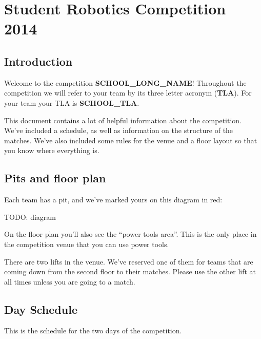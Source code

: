 \documentclass[12pt]{article}
\begin{document}
\section{Student Robotics Competition 2014}

\subsection{Introduction}

Welcome to the competition \textbf{SCHOOL_LONG_NAME}! Throughout the
competition we will refer to your team by its three letter acronym
(\textbf{TLA}). For your team your TLA is \textbf{SCHOOL_TLA}.

This document contains a lot of helpful information about the competition.
We've included a schedule, as well as information on the structure of the
matches. We've also included some rules for the venue and a floor layout so
that you know where everything is.

\subsection{Pits and floor plan}

Each team has a pit, and we've marked yours on this diagram in red:

TODO: diagram

On the floor plan you'll also see the ``power tools area''. This is the only
place in the competition venue that you can use power tools.

There are two lifts in the venue. We've reserved one of them for teams that are
coming down from the second floor to their matches. Please use the other lift
at all times unless you are going to a match.

\subsection{Day Schedule}

This is the schedule for the two days of the competition.
\end{document}

